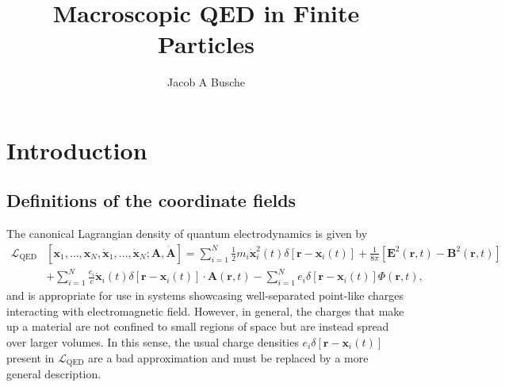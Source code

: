 \documentclass{article}
\begin{document}
\title{Macroscopic QED in Finite Particles}
\author{Jacob A Busche}
\maketitle











\section{Introduction}

\subsection{Definitions of the coordinate fields}\label{sec:coordinateFields}

The canonical Lagrangian density of quantum electrodynamics is given by\cite{cohen-tannoudji2004photons}
\begin{equation}\label{eq:lagrangianDensityQED}
\begin{split}
\mathcal{L}_\mathrm{QED}&\left[\mathbf{x}_1,\ldots,\mathbf{x}_N,\dot{\mathbf{x}}_1,\ldots,\dot{\mathbf{x}}_N;\mathbf{A},\dot{\mathbf{A}}\right] = \sum_{i = 1}^N\frac{1}{2}m_i\dot{\mathbf{x}}_i^2(t)\delta[\mathbf{r} - \mathbf{x}_i(t)] + \frac{1}{8\pi}\left[\mathbf{E}^2(\mathbf{r},t) - \mathbf{B}^2(\mathbf{r},t)\right]\\
&+ \sum_{i = 1}^N\frac{e_i}{c}\dot{\mathbf{x}}_i(t)\delta[\mathbf{r} - \mathbf{x}_i(t)]\cdot\mathbf{A}(\mathbf{r},t) - \sum_{i = 1}^Ne_i\delta[\mathbf{r} - \mathbf{x}_i(t)]\Phi(\mathbf{r},t),
\end{split}
\end{equation}
and is appropriate for use in systems showcasing well-separated point-like charges interacting with electromagnetic field. However, in general, the charges that make up a material are not confined to small regions of space but are instead spread over larger volumes. In this sense, the usual charge densities $e_i\delta[\mathbf{r} - \mathbf{x}_i(t)]$ present in $\mathcal{L}_\mathrm{QED}$ are a bad approximation and must be replaced by a more general description. 
\end{document}
